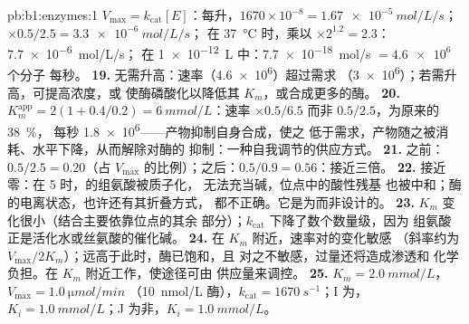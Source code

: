 \begin{solution}{pb:b1:enzymes:1}
$V_{\max} = k_{\text{cat}}[E]$：每升，$1670\times 10^{-8} =
\qty{1.67e-5}{mol/L/s}$；$\times 0.5/2.5 = \qty{3.3e-6}{mol/L/s}$；
在 \qty{37}{\celsius} 时，乘以 $\times 2^{1.2} = 2.3$：\qty{7.7e-6}{mol/L/s}；
在 \qty{1e-12}{L} 中：\qty{7.7e-18}{mol/s} $= \num{4.6e6}$ 个分子
每秒。
\textbf{19.} 无需升高：速率（\num{4.6e6}）超过需求
（\num{3e6}）；若需升高，可提高浓度，或
使酶磷酸化以降低其 $K_m$，或合成更多的酶。
\textbf{20.} $K_m^{\text{app}} = 2(1 + 0.4/0.2) = \qty{6}{mmol/L}$：速率
$\times 0.5/6.5$ 而非 $0.5/2.5$，为原来的 \qty{38}{\%}，
每秒 \num{1.8e6}——产物抑制自身合成，使之
低于需求，产物随之被消耗、水平下降，从而解除对酶的
抑制：一种自我调节的供应方式。
\textbf{21.} 之前：$0.5/2.5 = 0.20$（占 $V_{\max}$ 的比例）；之后：$0.5/0.9 =
0.56$：接近三倍。
\textbf{22.} 接近零：在  5 时，的组氨酸被质子化，
无法充当碱，位点中的酸性残基
也被中和；酶的电离状态，也许还有其折叠方式，
都不正确。它是为而非设计的。
\textbf{23.} $K_m$ 变化很小（结合主要依靠位点的其余
部分）；$k_{\text{cat}}$ 下降了数个数量级，因为
组氨酸正是活化水或丝氨酸的催化碱。
\textbf{24.} 在 $K_m$ 附近，速率对的变化敏感
（斜率约为 $V_{\max}/2K_m$）；远高于此时，酶已饱和，且
对之不敏感，过量还将造成渗透和
化学负担。在 $K_m$ 附近工作，使途径可由
供应量来调控。
\textbf{25.} $K_m = \qty{2.0}{mmol/L}$，$V_{\max} = \qty{1.0}{\micro mol/min}$
（\qty{10}{nmol/L} 酶），$k_{\text{cat}} = \qty{1670}{s^{-1}}$；I
为，$K_i = \qty{1.0}{mmol/L}$；J 为非，$K_i =
\qty{1.0}{mmol/L}$。
\end{solution}
